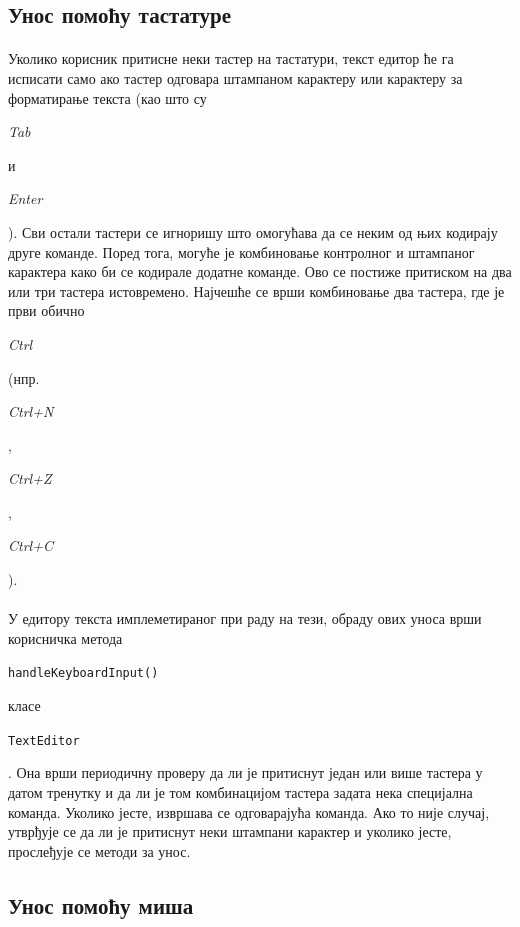 \documentclass[12pt,oneside]{memoir}
\begin{document}
\subsection{Унос помоћу тастатуре}
\paragraph{}
Уколико корисник притисне неки тастер на тастатури, текст едитор ће га исписати само
ако тастер одговара штампаном карактеру или карактеру за форматирање текста (као што
су \begin{latinica}\textit{Tab}\end{latinica} и \begin{latinica}\textit{Enter}\end{latinica}). Сви остали тастери се игноришу
што омогућава да се неким од њих кодирају друге команде. 
Поред тога, могуће је комбиновање контролног и штампаног карактера како
би се кодирале додатне команде. Ово се постиже притиском на два или три тастера истовремено. Најчешће се врши комбиновање два тастера, где је први обично \begin{latinica}\textit{Ctrl}\end{latinica} (нпр. 
\begin{latinica}\textit{Ctrl+N}\end{latinica}, \begin{latinica}\textit{Ctrl+Z}\end{latinica},
\begin{latinica}\textit{Ctrl+C}\end{latinica}).

\paragraph{}
У едитору текста имплеметираног при раду на тези, обраду ових уноса врши корисничка метода \begin{latinica}\verb|handleKeyboardInput()|\end{latinica} класе
\begin{latinica}\verb|TextEditor|\end{latinica}. Она врши периодичну проверу да ли
је притиснут један или више тастера у датом тренутку и да ли је том комбинацијом тастера 
задата нека специјална команда. Уколико јесте, извршава се одговарајућа команда. Ако
то није случај, утврђује се да ли је притиснут неки штампани карактер и уколико јесте,
прослеђује се методи за унос.


\subsection{Унос помоћу миша}
\end{document}
